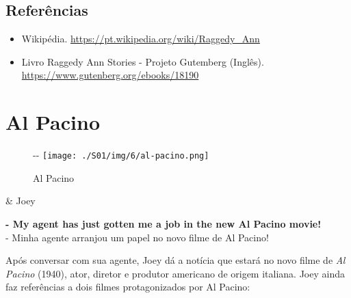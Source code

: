 \hypertarget{referuxeancias-2}{%
\subsection{Referências}\label{referuxeancias-2}}

\begin{itemize}
\tightlist
\item
  \sloppy Wikipédia. \url{https://pt.wikipedia.org/wiki/Raggedy_Ann}
\item
  \sloppy Livro Raggedy Ann Stories - Projeto Gutemberg (Inglês). \url{https://www.gutenberg.org/ebooks/18190}
\end{itemize}

\hypertarget{al-pacino}{%
\section{Al Pacino}\label{al-pacino}}

\begin{figure}[!ht]
  \begin{adjustwidth}{-\oddsidemargin-1in}{-\rightmargin}
    \centering
    \texttt{[image: ./S01/img/6/al-pacino.png]}
    \caption{Al Pacino\label{fig:al-pacino}}
  \end{adjustwidth}
\end{figure}

\begin{tcolorbox}[enhanced,center upper,
    drop fuzzy shadow southeast, boxrule=0.3pt,
    lower separated=false,
    colframe=black!30!dialogoBorder,colback=white]
\begin{minipage}[c]{0.16\linewidth}
   & \centering \scriptsize{Joey}
\end{minipage}
\hfill
\begin{minipage}[c]{0.8\linewidth}
  \textbf{- My agent has just gotten me a job in the new Al Pacino movie!}\\
  - Minha agente arranjou um papel no novo filme de Al Pacino!
\end{minipage}
\end{tcolorbox}

Após conversar com sua agente, Joey dá a notícia que estará no novo
filme de \emph{Al Pacino} (1940), ator, diretor e produtor americano de
origem italiana. Joey ainda faz referências a dois filmes protagonizados
por Al Pacino:

